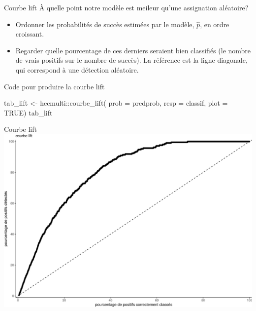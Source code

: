 \documentclass[
  ignorenonframetext,
]{beamer}
\newenvironment{Shaded}{\begin{snugshade}}{\end{snugshade}}
\newcommand{\AttributeTok}[1]{\textcolor[rgb]{0.40,0.45,0.13}{#1}}
\newcommand{\ConstantTok}[1]{\textcolor[rgb]{0.56,0.35,0.01}{#1}}
\newcommand{\FunctionTok}[1]{\textcolor[rgb]{0.28,0.35,0.67}{#1}}
\newcommand{\NormalTok}[1]{\textcolor[rgb]{0.00,0.23,0.31}{#1}}
\newcommand{\OtherTok}[1]{\textcolor[rgb]{0.00,0.23,0.31}{#1}}
\newcommand{\SpecialCharTok}[1]{\textcolor[rgb]{0.37,0.37,0.37}{#1}}
\providecommand{\tightlist}{%
  \setlength{\itemsep}{0pt}\setlength{\parskip}{0pt}}\usepackage{longtable,booktabs,array}
\begin{document}
\begin{frame}{Courbe lift}
\protect\hypertarget{courbe-lift}{}
À quelle point notre modèle est meileur qu'une assignation aléatoire?

\begin{itemize}
\tightlist
\item
  Ordonner les probabilités de succès estimées par le modèle,
  \(\widehat{p}\), en ordre croissant.
\item
  Regarder quelle pourcentage de ces derniers seraient bien classifiés
  (le nombre de vrais positifs sur le nombre de succès). La référence
  est la ligne diagonale, qui correspond à une détection aléatoire.
\end{itemize}
\end{frame}

\begin{frame}[fragile]{Code pour produire la courbe lift}
\protect\hypertarget{code-pour-produire-la-courbe-lift}{}
\begin{Shaded}
\begin{Highlighting}[numbers=left,,]
\NormalTok{tab\_lift }\OtherTok{\textless{}{-}}\NormalTok{ hecmulti}\SpecialCharTok{::}\FunctionTok{courbe\_lift}\NormalTok{(}
  \AttributeTok{prob =}\NormalTok{ predprob,}
  \AttributeTok{resp =}\NormalTok{ classif, }
  \AttributeTok{plot =} \ConstantTok{TRUE}\NormalTok{)}
\NormalTok{tab\_lift}
\end{Highlighting}
\end{Shaded}
\end{frame}

\begin{frame}{Courbe lift}
\protect\hypertarget{courbe-lift-1}{}
\includegraphics{MATH60602-diapos7_files/figure-beamer/figcourbe-lift-pr-1.pdf}
\end{frame}
\end{document}
